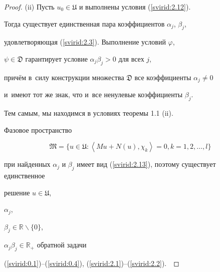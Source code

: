 \begin{proof}

(ii) Пусть $u_0\in\mathfrak{U}$ и выполнены условия (\ref{svirid:2.12}).

Тогда существует единственная пара коэффициентов $\alpha_j$, $\beta_j$,

удовлетворяющая (\ref{svirid:2.3}). Выполнение условий $\varphi$,

$\psi\in\mathfrak{D}$ гарантирует условие $\alpha_j\beta_j>0$ для всех $j$,

причём в~силу конструкции множества $\mathfrak{D}$ все коэффициенты $\alpha_j\neq 0$

и~имеют тот же знак, что и~все ненулевые коэффициенты $\beta_j$.

Тем самым, мы находимся в условиях теоремы 1.1 (ii).

Фазовое пространство

$$

\mathfrak{M}=\{u\in\mathfrak{U}: \left\langle Mu+N(u), \chi_k \right\rangle =0, k=1, 2, \ldots, l\}

$$

при найденных $\alpha_j$ и $\beta_j$ имеет вид (\ref{svirid:2.13}), поэтому существует единственное

ре\-ше\-ние $u\in\mathfrak{U}$,

$\alpha_j$,

$\beta_j\in\mathbb{R}\backslash\{0\}$,

$\alpha_j\beta_j\in\mathbb{R}_{+}$ обратной задачи

(\ref{svirid:0.1})--(\ref{svirid:0.4}), (\ref{svirid:2.1})--(\ref{svirid:2.2}).~\end{proof}



